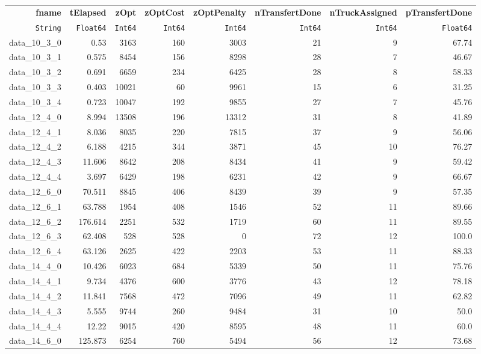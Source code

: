 \begin{tabular}{rrrrrrrr}
  \hline
  \textbf{fname} & \textbf{tElapsed} & \textbf{zOpt} & \textbf{zOptCost} & \textbf{zOptPenalty} & \textbf{nTransfertDone} & \textbf{nTruckAssigned} & \textbf{pTransfertDone} \\
  \texttt{String} & \texttt{Float64} & \texttt{Int64} & \texttt{Int64} & \texttt{Int64} & \texttt{Int64} & \texttt{Int64} & \texttt{Float64} \\\hline
  data\_10\_3\_0 & 0.53 & 3163 & 160 & 3003 & 21 & 9 & 67.74 \\
  data\_10\_3\_1 & 0.575 & 8454 & 156 & 8298 & 28 & 7 & 46.67 \\
  data\_10\_3\_2 & 0.691 & 6659 & 234 & 6425 & 28 & 8 & 58.33 \\
  data\_10\_3\_3 & 0.403 & 10021 & 60 & 9961 & 15 & 6 & 31.25 \\
  data\_10\_3\_4 & 0.723 & 10047 & 192 & 9855 & 27 & 7 & 45.76 \\
  data\_12\_4\_0 & 8.994 & 13508 & 196 & 13312 & 31 & 8 & 41.89 \\
  data\_12\_4\_1 & 8.036 & 8035 & 220 & 7815 & 37 & 9 & 56.06 \\
  data\_12\_4\_2 & 6.188 & 4215 & 344 & 3871 & 45 & 10 & 76.27 \\
  data\_12\_4\_3 & 11.606 & 8642 & 208 & 8434 & 41 & 9 & 59.42 \\
  data\_12\_4\_4 & 3.697 & 6429 & 198 & 6231 & 42 & 9 & 66.67 \\
  data\_12\_6\_0 & 70.511 & 8845 & 406 & 8439 & 39 & 9 & 57.35 \\
  data\_12\_6\_1 & 63.788 & 1954 & 408 & 1546 & 52 & 11 & 89.66 \\
  data\_12\_6\_2 & 176.614 & 2251 & 532 & 1719 & 60 & 11 & 89.55 \\
  data\_12\_6\_3 & 62.408 & 528 & 528 & 0 & 72 & 12 & 100.0 \\
  data\_12\_6\_4 & 63.126 & 2625 & 422 & 2203 & 53 & 11 & 88.33 \\
  data\_14\_4\_0 & 10.426 & 6023 & 684 & 5339 & 50 & 11 & 75.76 \\
  data\_14\_4\_1 & 9.734 & 4376 & 600 & 3776 & 43 & 12 & 78.18 \\
  data\_14\_4\_2 & 11.841 & 7568 & 472 & 7096 & 49 & 11 & 62.82 \\
  data\_14\_4\_3 & 5.555 & 9744 & 260 & 9484 & 31 & 10 & 50.0 \\
  data\_14\_4\_4 & 12.22 & 9015 & 420 & 8595 & 48 & 11 & 60.0 \\
  data\_14\_6\_0 & 125.873 & 6254 & 760 & 5494 & 56 & 12 & 73.68 \\

\end{tabular}
